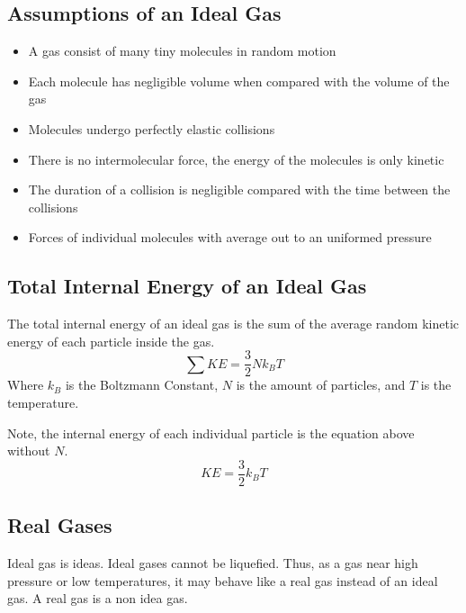 \documentclass[../notes.tex]{subfiles}
\begin{document}
\subsection{Assumptions of an Ideal Gas}
\begin{itemize}
	\item A gas consist of many tiny molecules in random motion
	\item Each molecule has negligible volume when compared with the volume of the gas
	\item Molecules undergo perfectly elastic collisions
	\item There is no intermolecular force, the energy of the molecules is only kinetic
	\item The duration of a collision is negligible compared with the time between the collisions
	\item Forces of individual molecules with average out to an uniformed pressure
\end{itemize}

\subsection{Total Internal Energy of an Ideal Gas}
The total internal energy of an ideal gas is the sum of the average random kinetic energy of each particle inside the gas.
\begin{equation}
	\sum KE = \frac{3}{2} N k_B T
\end{equation}
Where $k_B$ is the Boltzmann Constant, $N$ is the amount of particles, and $T$ is the temperature.

Note, the internal energy of each individual particle is the equation above without $N$.
\begin{equation}
	KE = \frac{3}{2} k_B T
\end{equation}

\subsection{Real Gases}
Ideal gas is ideas.
Ideal gases cannot be liquefied.
Thus, as a gas near high pressure or low temperatures, it may behave like a real gas instead of an ideal gas.
A real gas is a non idea gas.
\end{document}
